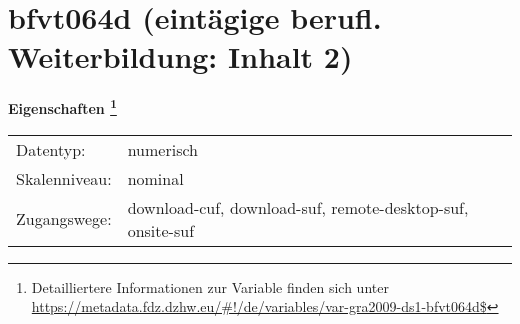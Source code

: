 
    \setcounter{footnote}{0}

    \vspace*{-1.8cm}
	\section{bfvt064d (eintägige berufl. Weiterbildung: Inhalt 2)}
	\label{section:bfvt064d}



    \vspace*{0.5cm}
    \noindent\textbf{Eigenschaften
	\footnote{Detailliertere Informationen zur Variable finden sich unter
		\url{https://metadata.fdz.dzhw.eu/\#!/de/variables/var-gra2009-ds1-bfvt064d$}}}\\
	\begin{tabularx}{\hsize}{@{}lX}
	Datentyp: & numerisch \\
	Skalenniveau: & nominal \\
	Zugangswege: &
	  download-cuf, 
	  download-suf, 
	  remote-desktop-suf, 
	  onsite-suf
 \\
    \end{tabularx}



